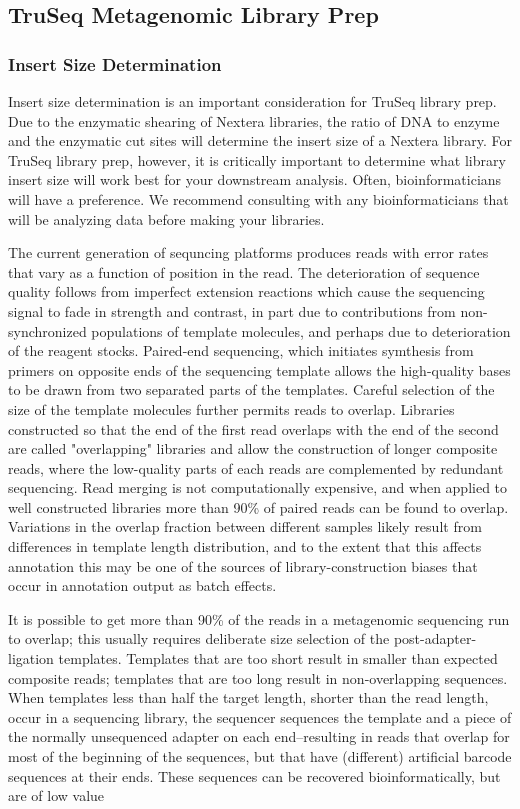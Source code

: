 \documentclass[graybox]{svmult}
\begin{document}
\subsection{TruSeq Metagenomic Library Prep}
\subsubsection{ Insert Size Determination}

Insert size determination is an important consideration for TruSeq library prep. Due to the enzymatic shearing of Nextera libraries, the ratio of DNA to enzyme and the enzymatic cut sites will determine the insert size of a Nextera library. For TruSeq library prep, however, it is critically important to determine what library insert size will work best for your downstream analysis. Often, bioinformaticians will have a preference. We recommend consulting with any bioinformaticians that will be analyzing data before making your libraries. 

        The current generation of sequncing platforms produces reads with error rates that vary as a function of position in the read.  The deterioration of sequence quality follows from imperfect extension reactions which cause the sequencing signal to fade in strength and contrast, in part due to contributions from non-synchronized populations of template molecules, and perhaps due to deterioration of the reagent stocks.   Paired-end sequencing, which initiates symthesis from primers on opposite ends of the sequencing template allows the high-quality bases to be drawn from two separated parts of the templates.  Careful selection of the size of the template molecules further permits reads to overlap.  Libraries constructed so that the end of the first read overlaps with the end of the second are called "overlapping" libraries and allow the construction of longer composite reads, where the low-quality parts of each reads are complemented by redundant sequencing.  Read merging is not computationally expensive, and when applied to well constructed libraries more than 90\% of paired reads can be found to overlap.  Variations in the overlap fraction between different samples likely result from differences in template length distribution, and to the extent that this affects annotation this may be one of the sources of library-construction biases that occur in annotation output as batch effects.
        
It is possible to get more than 90\% of the reads in a metagenomic sequencing run to overlap; this usually requires deliberate size selection of the post-adapter-ligation templates.   Templates that are too short result in smaller than expected composite reads; templates that are too long result in non-overlapping sequences.   When templates less than half the target length, shorter than the read length, occur in a sequencing library, the sequencer sequences the template and a piece of the normally unsequenced adapter on each end--resulting in reads that overlap for most of the beginning of the sequences, but that have (different) artificial barcode sequences at their ends.   These sequences can be recovered bioinformatically, but are of low value
\end{document}
